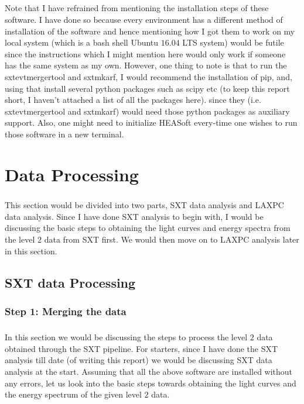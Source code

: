 \documentclass[a4paper,twoside]{report}
\numberwithin{equation}{section}
\begin{document}
\paragraph{}
Note that I have refrained from mentioning the installation steps of these software. I have done so because every environment has a different method of installation of the software and hence mentioning how I got them to work on my local system (which is a bash shell Ubuntu $16.04$ LTS system) would be futile since the instructions which I might mention here would only work if someone has the same system as my own. However, one thing to note is that to run the sxtevtmergertool and sxtmkarf, I would recommend the installation of pip, and, using that install several python packages such as scipy etc (to keep this report short, I haven’t attached a list of all the packages here). since they (i.e. sxtevtmergertool and sxtmkarf) would need those python packages as auxiliary support. Also, one might need to initialize HEASoft every-time one wishes to run those software in a new terminal.
\chapter{Data Processing}
\paragraph{}
This section would be divided into two parts, SXT data analysis and LAXPC data analysis. Since I have done SXT analysis to begin with, I would be discussing the basic steps to obtaining the light curves and energy spectra from the level $2$ data from SXT first. We would then move on to LAXPC analysis later in this section.
\section{SXT data Processing}
\subsection{Step 1: Merging the data}
\paragraph{}
In this section we would be discussing the steps to process the level $2$ data obtained through the SXT pipeline. For starters, since I have done the SXT analysis till date (of writing this report) we would be discussing SXT data analysis at the start. Assuming that all the above software are installed without any errors, let us look into the basic steps towards obtaining the light curves and the energy spectrum of the given level $2$ data. 
\end{document}
